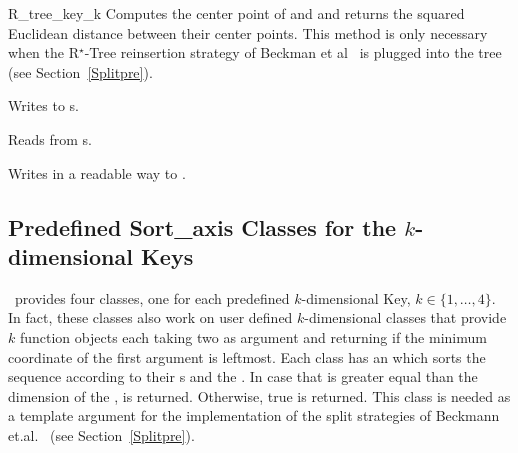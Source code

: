 \begin{ccClass}{R_tree_key_k}
{Computes the center point of  and   and returns
  the squared Euclidean distance between their center points. 
This method is only
  necessary when the R$^\star$-Tree reinsertion strategy of Beckman et
  al~\cite{bkss-rtera-90} is plugged into the tree (see
  Section~\ref{Splitpre}).}


{Writes  to s.}

{Reads  from s.}

{Writes  in a readable way to .}

\end{ccClass}

\subsection{Predefined Sort\_axis Classes for the $k$-dimensional Keys}
\label{Presort}
\cgal\ provides four  classes, one for each
predefined $k$-dimensional Key, $k\in\{1,\ldots,4\}$. In fact,
these classes also work on user defined $k$-dimensional  classes that
provide $k$ function objects 
each taking two  as argument and returning 
if the minimum coordinate of the first argument is leftmost.   Each class
has an  which sorts the
sequence \ccc{[first,last[} according to their s and the
. In
case that  is greater equal than the dimension of
the ,  is returned. Otherwise, true is returned.
This class is needed  as a template argument for the
implementation of the split strategies of  Beckmann
et.al.~\cite{bkss-rtera-90} (see Section~\ref{Splitpre}). 


